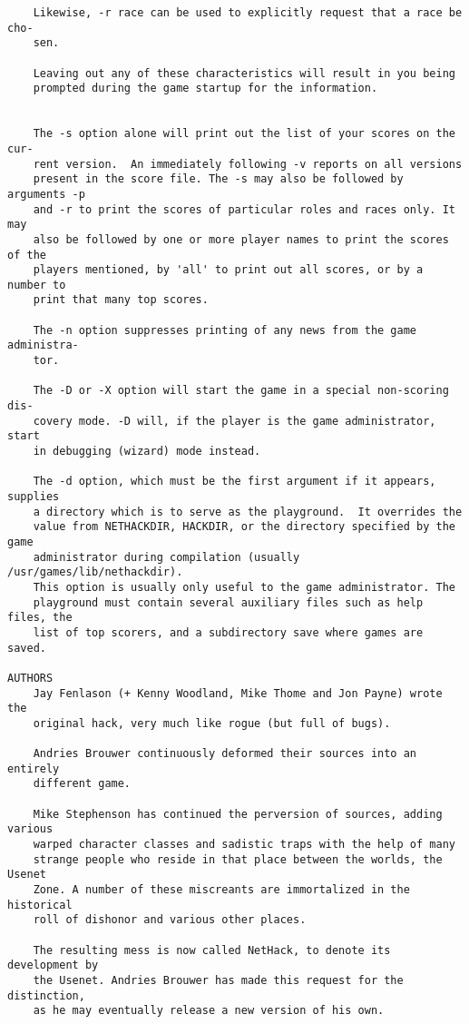 \documentclass[11pt]{article}
\begin{document}
\begin{verbatim}
    Likewise, -r race can be used to explicitly request that a race be cho-
    sen.

    Leaving out any of these characteristics will result in you being
    prompted during the game startup for the information.


    The -s option alone will print out the list of your scores on the cur-
    rent version.  An immediately following -v reports on all versions
    present in the score file. The -s may also be followed by arguments -p
    and -r to print the scores of particular roles and races only. It may
    also be followed by one or more player names to print the scores of the
    players mentioned, by 'all' to print out all scores, or by a number to
    print that many top scores.

    The -n option suppresses printing of any news from the game administra-
    tor.

    The -D or -X option will start the game in a special non-scoring dis-
    covery mode. -D will, if the player is the game administrator, start
    in debugging (wizard) mode instead.

    The -d option, which must be the first argument if it appears, supplies
    a directory which is to serve as the playground.  It overrides the
    value from NETHACKDIR, HACKDIR, or the directory specified by the game
    administrator during compilation (usually /usr/games/lib/nethackdir).
    This option is usually only useful to the game administrator. The
    playground must contain several auxiliary files such as help files, the
    list of top scorers, and a subdirectory save where games are saved.

AUTHORS
    Jay Fenlason (+ Kenny Woodland, Mike Thome and Jon Payne) wrote the
    original hack, very much like rogue (but full of bugs).

    Andries Brouwer continuously deformed their sources into an entirely
    different game.

    Mike Stephenson has continued the perversion of sources, adding various
    warped character classes and sadistic traps with the help of many
    strange people who reside in that place between the worlds, the Usenet
    Zone. A number of these miscreants are immortalized in the historical
    roll of dishonor and various other places.

    The resulting mess is now called NetHack, to denote its development by
    the Usenet. Andries Brouwer has made this request for the distinction,
    as he may eventually release a new version of his own.


\end{verbatim}
\end{document}
